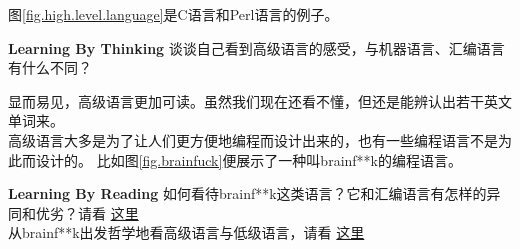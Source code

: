 图\ref{fig.high.level.language}是C语言和Perl语言的例子。
\begin{paperbox}{\textbf{Learning By Thinking}\starfour}
谈谈自己看到高级语言的感受，与机器语言、汇编语言有什么不同？
\end{paperbox}
显而易见，高级语言更加可读。虽然我们现在还看不懂，但还是能辨认出若干英文单词来。\\
高级语言大多是为了让人们更方便地编程而设计出来的，也有一些编程语言不是为此而设计的。
比如图\ref{fig.brainfuck}便展示了一种叫brainf**k的编程语言。
\begin{paperbox}{\textbf{Learning By Reading}\starone}
如何看待brainf**k这类语言？它和汇编语言有怎样的异同和优劣？请看
\href{https://www.slant.co/versus/120/128/~assembly_vs_brainfuck}{这里}\\
从brainf**k出发哲学地看高级语言与低级语言，请看
\href{https://esolangs.org/wiki/Category_talk:Low-level}{这里}
\end{paperbox}
